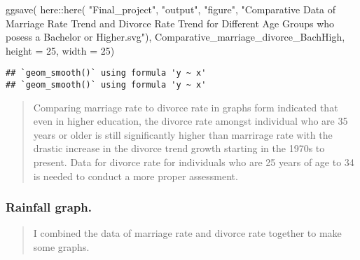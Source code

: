 \documentclass[
]{article}
\newenvironment{Shaded}{\begin{snugshade}}{\end{snugshade}}
\newcommand{\AttributeTok}[1]{\textcolor[rgb]{0.77,0.63,0.00}{#1}}
\newcommand{\DecValTok}[1]{\textcolor[rgb]{0.00,0.00,0.81}{#1}}
\newcommand{\FunctionTok}[1]{\textcolor[rgb]{0.00,0.00,0.00}{#1}}
\newcommand{\NormalTok}[1]{#1}
\newcommand{\SpecialCharTok}[1]{\textcolor[rgb]{0.00,0.00,0.00}{#1}}
\newcommand{\StringTok}[1]{\textcolor[rgb]{0.31,0.60,0.02}{#1}}
\begin{document}
\begin{Shaded}
\begin{Highlighting}[]
\FunctionTok{ggsave}\NormalTok{(}
\NormalTok{  here}\SpecialCharTok{::}\FunctionTok{here}\NormalTok{(}
    \StringTok{"Final\_project"}\NormalTok{,}
    \StringTok{"output"}\NormalTok{,}
    \StringTok{"figure"}\NormalTok{,}
    \StringTok{"Comparative Data of Marriage Rate Trend and Divorce Rate Trend for Different Age Groups who posess a Bachelor or Higher.svg"}\NormalTok{),}
\NormalTok{       Comparative\_marriage\_divorce\_BachHigh,}
       \AttributeTok{height =} \DecValTok{25}\NormalTok{,}
       \AttributeTok{width =} \DecValTok{25}\NormalTok{)}
\end{Highlighting}
\end{Shaded}

\begin{verbatim}
## `geom_smooth()` using formula 'y ~ x'
## `geom_smooth()` using formula 'y ~ x'
\end{verbatim}

\begin{quote}
Comparing marriage rate to divorce rate in graphs form indicated that
even in higher education, the divorce rate amongst individual who are 35
years or older is still significantly higher than marrirage rate with
the drastic increase in the divorce trend growth starting in the 1970s
to present. Data for divorce rate for individuals who are 25 years of
age to 34 is needed to conduct a more proper assessment.
\end{quote}

\hypertarget{rainfall-graph.}{%
\subsubsection{Rainfall graph.}\label{rainfall-graph.}}

\begin{quote}
I combined the data of marriage rate and divorce rate together to make
some graphs.
\end{quote}
\end{document}
